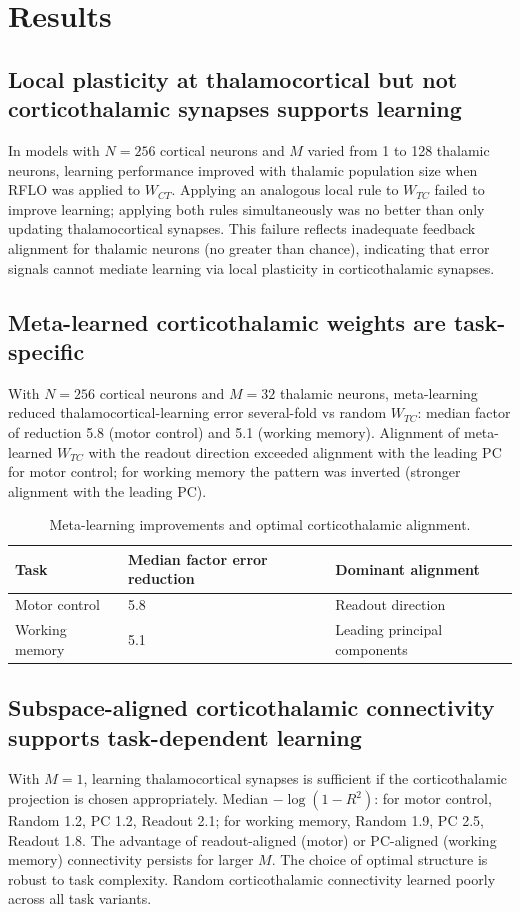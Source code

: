 \documentclass[11pt]{article}
\begin{document}
\section{Results}
\subsection{Local plasticity at thalamocortical but not corticothalamic synapses supports learning}
In models with $N = 256$ cortical neurons and $M$ varied from 1 to 128 thalamic neurons, learning performance improved with thalamic population size when RFLO was applied to $W_{CT}$. Applying an analogous local rule to $W_{TC}$ failed to improve learning; applying both rules simultaneously was no better than only updating thalamocortical synapses. This failure reflects inadequate feedback alignment for thalamic neurons (no greater than chance), indicating that error signals cannot mediate learning via local plasticity in corticothalamic synapses.

\subsection{Meta-learned corticothalamic weights are task-specific}
With $N = 256$ cortical neurons and $M = 32$ thalamic neurons, meta-learning reduced thalamocortical-learning error several-fold vs random $W_{TC}$: median factor of reduction 5.8 (motor control) and 5.1 (working memory). Alignment of meta-learned $W_{TC}$ with the readout direction exceeded alignment with the leading PC for motor control; for working memory the pattern was inverted (stronger alignment with the leading PC).

\begin{table}[h]
\centering
\caption{Meta-learning improvements and optimal corticothalamic alignment.}
\begin{tabular}{lll}
\toprule
Task & Median factor error reduction & Dominant alignment \\
\midrule
Motor control & 5.8 & Readout direction \\
Working memory & 5.1 & Leading principal components \\
\bottomrule
\end{tabular}
\end{table}

\subsection{Subspace-aligned corticothalamic connectivity supports task-dependent learning}
With $M = 1$, learning thalamocortical synapses is sufficient if the corticothalamic projection is chosen appropriately. Median $-\log(1 - R^2)$: for motor control, Random 1.2, PC 1.2, Readout 2.1; for working memory, Random 1.9, PC 2.5, Readout 1.8. The advantage of readout-aligned (motor) or PC-aligned (working memory) connectivity persists for larger $M$. The choice of optimal structure is robust to task complexity. Random corticothalamic connectivity learned poorly across all task variants.
\end{document}
